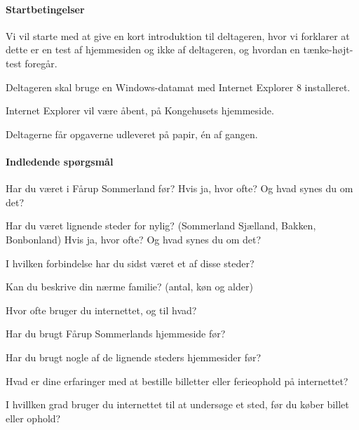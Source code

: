 \documentclass[10pt,a4paper]{article}      %
\begin{document}
\paragraph{Startbetingelser}
\begin{opgaver}
\item Vi vil starte med at give en kort introduktion til deltageren, hvor vi
forklarer at dette er en test af hjemmesiden og ikke af deltageren, og hvordan
en tænke-højt-test foregår.
\item Deltageren skal bruge en Windows-datamat med Internet Explorer 8
installeret.
\item Internet Explorer vil være åbent, på Kongehusets hjemmeside.
\item Deltagerne får opgaverne udleveret på papir, én af gangen.
\end{opgaver}

\paragraph{Indledende spørgsmål}
\begin{opgaver}
\item Har du været i Fårup Sommerland før? Hvis ja, hvor ofte? Og hvad synes du
om det?
\item Har du været lignende steder for nylig? (Sommerland Sjælland, Bakken,
Bonbonland) Hvis ja, hvor ofte? Og hvad synes du om det?
\item I hvilken forbindelse har du sidst været et af disse steder?
\item Kan du beskrive din nærme familie? (antal, køn og alder)
\item Hvor ofte bruger du internettet, og til hvad?
\item Har du brugt Fårup Sommerlands hjemmeside før?
\item Har du brugt nogle af de lignende steders hjemmesider før?
\item Hvad er dine erfaringer med at bestille billetter eller ferieophold på
internettet?
\item I hvillken grad bruger du internettet til at undersøge et sted, før du
køber billet eller ophold?
\end{opgaver}

\newcommand{\note}[1]{\newline {\small\it Note: #1}}
\end{document}

